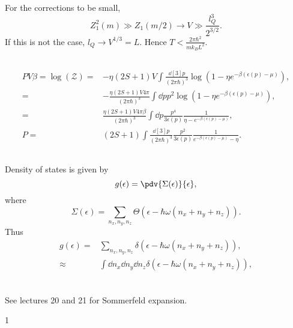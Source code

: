 \documentclass[a4paper,12pt,twoside]{article}
\newcommand{\mcols}{0}
\begin{document}
\begin{multicols*}{2}
\subsubsection{}
For the corrections to be small,
\begin{equation}
	Z_1^2(m) \gg Z_1(m/2) \rightarrow V \gg \frac{l_Q^3}{2^{3/2}}.
\end{equation}
If this is not the case, $l_Q \rightarrow V^{1/3} = L$.
Hence $T < \frac{2\pi \hbar^2}{m k_B L^2}$.

\subsection{}
\begin{align}
	PV\beta = \log(\mathcal{Z}) =& -\eta(2S+1)V\int\frac{\dd[3]{p}}{(2\pi\hbar)^3}\log(1-\eta e^{-\beta(\epsilon(p) - \mu)}),\\
	=& -\frac{\eta(2S+1)V 4\pi}{(2\pi\hbar)^3} \int \dd{p} p^2 \log(1-\eta e^{-\beta(\epsilon(p)-\mu)}),\\
	=& \frac{\eta (2S+1)V 4\pi \beta}{(2\pi\hbar)^3} \int \dd{p}\frac{p^4}{3\epsilon(p)} \frac{1}{\eta - e^{-\beta(\epsilon(p)-\mu)}},\\
	P =& (2S+1) \int \frac{\dd[3]{p}}{(2\pi\hbar)^3}\frac{p^2}{3\epsilon(p)} \frac{1}{e^{-\beta(\epsilon(p)-\mu)}-\eta}.
\end{align}
\subsection{}
Density of states is given by
\begin{equation}
	g(\epsilon) = \pdv{\Sigma(\epsilon)}{\epsilon},
\end{equation}
where
\begin{equation}
	\Sigma(\epsilon) = \sum_{n_x,n_y,n_z} \Theta(\epsilon - \hbar\omega(n_x+n_y+n_z)).
\end{equation}
Thus
\begin{align}
	g(\epsilon) =& \sum_{n_x,n_y,n_z} \delta(\epsilon - \hbar\omega(n_x+n_y+n_z)),\\
	\approx& \int \dd{n_x}\dd{n_y}\dd{n_z} \delta(\epsilon - \hbar\omega(n_x+n_y+n_z)),\\
\end{align}
\subsection{}
See lectures 20 and 21 for Sommerfeld expansion.

\printBib


\if\mcols1
\end{multicols*}
\fi
\end{document}
